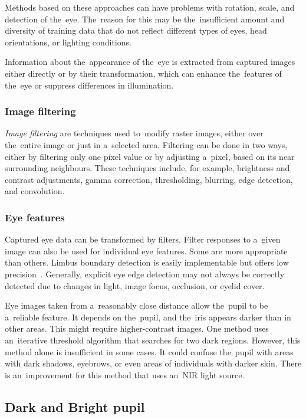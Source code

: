 Methods based on these approaches can have problems with rotation, scale, and detection of the~eye. The~reason for this may be the~insufficient amount and diversity of training data that do not reflect different types of eyes, head orientations, or lighting conditions. 

Information about the~appearance of the~eye is extracted from captured images either directly or by their transformation, which can enhance the~features of the~eye or suppress differences in illumination.

\pagebreak{}
\subsubsection*{Image filtering}
\emph{Image filtering} are techniques used to~modify raster images, either over the~entire image or just in a~selected area. Filtering can be done in two ways, either by filtering only one pixel value or by adjusting a~pixel, based on its near surrounding neighbours. These techniques include, for example, brightness and contrast adjustments, gamma correction, thresholding, blurring, edge detection, and convolution.~\cite{trnka2020thesis}

\subsubsection*{Eye features}
Captured eye data can be transformed by filters. Filter responses to a~given image can also be used for individual eye features. Some are more appropriate than others. Limbus boundary detection is easily implementable but offers low precision~\cite{cognolato2018}. Generally, explicit eye edge detection may not always be correctly detected due to changes in light, image focus, occlusion, or eyelid cover.

Eye images taken from a~reasonably close distance allow the~pupil to be a~reliable feature. It depends on the~pupil, and the~iris appears darker than in other areas. This might require higher-contrast images. One method uses an~iterative threshold algorithm that searches for two dark regions. However, this method alone is insufficient in some cases. It could confuse the~pupil with areas with dark shadows, eyebrows, or even areas of individuals with darker skin. There is an~improvement for this method that uses an~NIR light source.

\subsection{Dark and Bright pupil}
\label{sec:dp-method}

